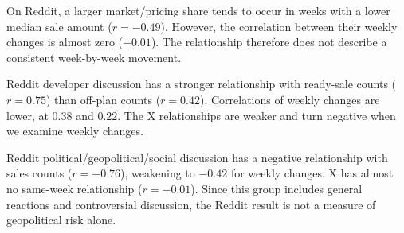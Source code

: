On Reddit, a larger market/pricing share tends to occur in weeks with a lower median sale amount ($r=-0.49$). However, the correlation between their weekly changes is almost zero ($-0.01$). The relationship therefore does not describe a consistent week-by-week movement.

Reddit developer discussion has a stronger relationship with ready-sale counts ($r=0.75$) than off-plan counts ($r=0.42$). Correlations of weekly changes are lower, at $0.38$ and $0.22$. The X relationships are weaker and turn negative when we examine weekly changes.

Reddit political/geopolitical/social discussion has a negative relationship with sales counts ($r=-0.76$), weakening to $-0.42$ for weekly changes. X has almost no same-week relationship ($r=-0.01$). Since this group includes general reactions and controversial discussion, the Reddit result is not a measure of geopolitical risk alone.
